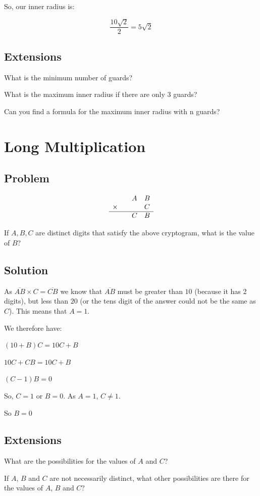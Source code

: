 \documentclass{book}
\begin{document}
So, our inner radius is:

\[\frac{10\sqrt{2}}{2}=\boxed{5\sqrt{2}}\]
\subsection{Extensions}
What is the minimum number of guards?

What is the maximum inner radius if there are only 3 guards?

Can you find a formula for the maximum inner radius with n guards?
\newpage


\section{Long Multiplication}
\subsection{Problem}
\[ \begin{array} { l l l l }
& & A & B \\ \times & & & C \\ \hline & & C & B \\ \end{array} \]

If \( A, B, C \) are distinct digits that satisfy the above cryptogram, what is the value of \(B\)?
\subsection{Solution}
As \(\overline{AB}\times C = \overline{CB}\) we know that \(\overline{AB}\) must be greater than \(10\) (because it has 2 digits), but less than \(20\) (or the tens digit of the answer could not be the same as \(C\)). This means that \(A=1\).

We therefore have:

\((10+B)C=10C+B\)

\(10C+CB=10C+B\)

\((C-1)B=0\)

So, \(C=1\) or \(B=0\). As \(A=1\), \(C\neq 1\).

So \(\boxed{B=0}\)
\subsection{Extensions}
What are the possibilities for the values of \(A\) and \(C\)?

If \(A\), \(B\) and \(C\) are not necessarily distinct, what other possibilities are there for the values of \(A\), \(B\) and \(C\)?
\newpage
\end{document}
